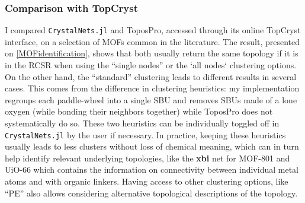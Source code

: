 \documentclass[main.tex]{subfiles}
\begin{document}
\subsubsection{Comparison with TopCryst}

I compared \texttt{CrystalNets.jl} and ToposPro, accessed through its online TopCryst interface, on a selection of MOFs common in the literature. The result, presented on \cref{MOFidentification}, shows that both usually return the same topology if it is in the RCSR when using the ``single nodes'' or the `all nodes` clustering options. On the other hand, the ``standard'' clustering leads to different results in several cases. This comes from the difference in clustering heuristics: my implementation regroups each paddle-wheel into a single SBU and removes SBUs made of a lone oxygen (while bonding their neighbors together) while ToposPro does not systematically do so. These two heuristics can be individually toggled off in \texttt{CrystalNets.jl} by the user if necessary. In practice, keeping these heuristics usually leads to less clusters without loss of chemical meaning, which can in turn help identify relevant underlying topologies, like the \textbf{xbi} net for MOF-801 and UiO-66 which contains the information on connectivity between individual metal atoms and with organic linkers. Having access to other clustering options, like ``PE'' also allows considering alternative topological descriptions of the topology.
\end{document}
